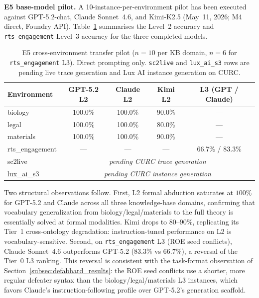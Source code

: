 \documentclass{article}
\theoremstyle{definition}
\begin{document}
\textbf{E5 base-model pilot.}
A 10-instance-per-environment pilot has been executed against GPT-5.2-chat, Claude Sonnet~4.6, and Kimi-K2.5 (May~11, 2026; M4 direct, Foundry API). Table~\ref{tab:e5_pilot} summarises the Level~2 accuracy and \texttt{rts\_engagement} Level~3 accuracy for the three completed models.

\begin{table}[h]
\centering
\caption{E5 cross-environment transfer pilot ($n=10$ per KB domain, $n=6$ for \texttt{rts\_engagement} L3). Direct prompting only. \texttt{sc2live} and \texttt{lux\_ai\_s3} rows are pending live trace generation and Lux AI instance generation on CURC.}
\label{tab:e5_pilot}
\small
\begin{tabular}{@{}lcccc@{}}
\toprule
\textbf{Environment} & GPT-5.2 L2 & Claude L2 & Kimi L2 & L3 (GPT / Claude) \\
\midrule
biology          & 100.0\% & 100.0\% & 90.0\% & --- \\
legal            & 100.0\% & 100.0\% & 80.0\% & --- \\
materials        & 100.0\% & 100.0\% & 90.0\% & --- \\
rts\_engagement  & ---     & ---     & ---    & 66.7\% / 83.3\% \\
sc2live          & \multicolumn{4}{c}{\textit{pending CURC trace generation}} \\
lux\_ai\_s3      & \multicolumn{4}{c}{\textit{pending CURC instance generation}} \\
\bottomrule
\end{tabular}
\end{table}

Two structural observations follow. First, L2 formal abduction saturates at $100\%$ for GPT-5.2 and Claude across all three knowledge-base domains, confirming that vocabulary generalization from biology/legal/materials to the full theory is essentially solved at formal modalities. Kimi drops to $80$--$90\%$, replicating its Tier~1 cross-ontology degradation: instruction-tuned performance on L2 is vocabulary-sensitive. Second, on \texttt{rts\_engagement} L3 (ROE seed conflicts), Claude Sonnet~4.6 outperforms GPT-5.2 ($83.3\%$ vs $66.7\%$), a reversal of the Tier~0 L3 ranking. This reversal is consistent with the task-format observation of Section~\ref{subsec:defabhard_results}: the ROE seed conflicts use a shorter, more regular defeater syntax than the biology/legal/materials L3 instances, which favors Claude's instruction-following profile over GPT-5.2's generation scaffold.
\end{document}
